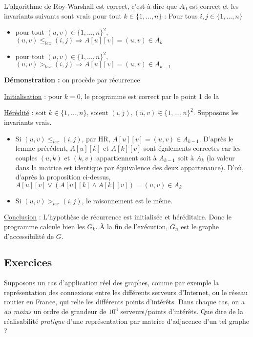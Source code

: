 \documentclass[../../../main.tex]{subfiles}
\begin{document}
 L'algorithme de Roy-Warshall est correct, c'est-à-dire que $A_0$ est correct et les invariants suivants sont vrais pour tout $k\in \{1, \dots, n\}$ :
\newline
Pour tous $i, j\in \{1, \dots, n\}$
\begin{itemize}
	\item pour tout $(u, v)\in \{1, \dots, n\}^2$, $(u, v)\leq_{lex} (i, j) \Rightarrow A[u][v] = (u, v)\in A_k$
	\item pour tout $(u, v)\in \{1, \dots, n\}^2$, $(u, v) >_{lex} (i, j) \Rightarrow A[u][v] = (u, v)\in A_{k-1}$
\end{itemize}
\textbf{Démonstration :} on procède par récurrence

\underline{Initialisation} : pour $k = 0$, le programme est correct par le point 1 de la 

\underline{Hérédité} : soit $k\in\{1, \dots, n\}$, soient $(i, j), (u, v)\in\{1, \dots, n\}^2$. Supposons les invariants vrais.
\begin{itemize}
	\item Si $(u, v)\leq_{lex} (i, j)$, par HR, $A[u][v] = (u, v)\in A_{k-1}$.\newline
	D'après le lemme précédent, $A[u][k]$ et $A[k][v]$ sont égalements correctes car les couples $(u, k)$ et $(k, v)$ appartiennent soit à $A_{k-1}$ soit à $A_k$ (la valeur dans la matrice est identique par équivalence des deux appartenance).\newline
	D'où, d'après la proposition ci-dessus, $A[u][v]\vee (A[u][k] \wedge A[k][v]) = (u, v)\in A_k$
	\item Si $(u, v)>_{lex} (i, j)$, le raisonnement est le même.
\end{itemize}

\underline{Conclusion} : L'hypothèse de récurrence est initialisée et héréditaire. Donc le programme calcule bien les $G_k$. À la fin de l'exécution, $G_n$ est le graphe d'accessibilité de $G$.
\subsection{Exercices}
 Supposons un cas d'application réel des graphes, comme par exemple la représentation des connexions entre les différents serveurs d'Internet, ou le réseau routier en France, qui relie les différents points d'intérêts. Dans chaque cas, on a \textit{au moins} un ordre de grandeur de $10^6$ serveurs/points d'intérêts. Que dire de la réalisabilité \textit{pratique} d'une représentation par matrice d'adjacence d'un tel graphe ?
\end{document}

